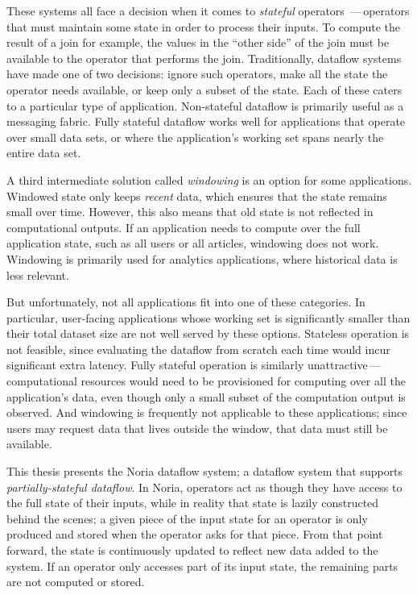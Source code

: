 These systems all face a decision when it comes to \emph{stateful} operators\,
---\,operators that must maintain some state in order to process their inputs.
To compute the result of a join for example, the values in the ``other side'' of
the join must be available to the operator that performs the join.
Traditionally, dataflow systems have made one of two decisions: ignore such
operators, make all the state the operator needs available, or keep only a
subset of the state. Each of these caters to a particular type of application.
Non-stateful dataflow is primarily useful as a messaging fabric. Fully stateful
dataflow works well for applications that operate over small data sets, or where
the application's working set spans nearly the entire data set.

A third intermediate solution called \emph{windowing} is an option for some
applications. Windowed state only keeps \emph{recent} data, which ensures that
the state remains small over time. However, this also means that old state is
not reflected in computational outputs. If an application needs to compute over
the full application state, such as all users or all articles, windowing does
not work. Windowing is primarily used for analytics applications, where
historical data is less relevant.

But unfortunately, not all applications fit into one of these categories. In
particular, user-facing applications whose working set is significantly smaller
than their total dataset size are not well served by these options. Stateless
operation is not feasible, since evaluating the dataflow from scratch each time
would incur significant extra latency. Fully stateful operation is similarly
unattractive\,---\,computational resources would need to be provisioned for
computing over all the application's data, even though only a small subset of
the computation output is observed. And windowing is frequently not applicable
to these applications; since users may request data that lives outside the
window, that data must still be available.

This thesis presents the Noria dataflow system; a dataflow system that supports
\emph{partially-stateful dataflow}. In Noria, operators act as though they have
access to the full state of their inputs, while in reality that state is lazily
constructed behind the scenes; a given piece of the input state for an operator
is only produced and stored when the operator asks for that piece. From that
point forward, the state is continuously updated to reflect new data added to
the system. If an operator only accesses part of its input state, the remaining
parts are not computed or stored.

